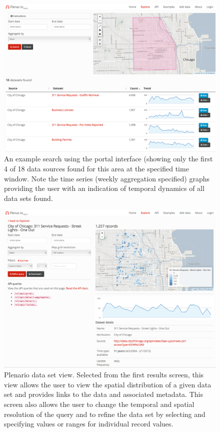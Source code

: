 \documentclass[11pt]{article}
\begin{document}
\begin{figure}
	\centering
	\label{fig:plenario-search-example}
	\caption{An example search using the portal interface (showing only the first 4 of 18 data sources found for this area at the specified time window. Note the time series (weekly aggregation specified) graphs providing the user with an indication of temporal dynamics of all data sets found.\vspace{.4cm}}
	\includegraphics[scale=.25]{plenario_search_example.png}
\end{figure}

\begin{figure}
	\centering
	\label{fig:plenario-dataset-vew}
	\caption{Plenario data set view. Selected from the first results screen, this view allows the user to view the spatial distribution of a given data set and provides links to the data and associated metadata. This screen also allows the user to change the temporal and spatial resolution of the query and to refine the data set by selecting and specifying values or ranges for individual record values.\vspace{.4cm}}
	\includegraphics[scale=.25]{plenario_dataset_view.png}
\end{figure}
\end{document}
